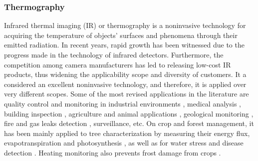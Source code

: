 \subsubsection{Thermography}
\label{sec:thermography_imaging}

Infrared thermal imaging (IR) or thermography is a noninvasive technology for acquiring the temperature of objects' surfaces and phenomena through their emitted radiation. In recent years, rapid growth has been witnessed due to the progress made in the technology of infrared detectors. Furthermore, the competition among camera manufacturers has led to releasing low-cost IR products, thus widening the applicability scope and diversity of customers. It a considered an excellent noninvasive technology, and therefore, it is applied over very different scopes. Some of the most revised applications in the literature are quality control and monitoring in industrial environments \cite{alfredo_osornio-rios_recent_2019, vollmer_infrared_2017}, medical analysis \cite{lorinczy_thermal_2017}, building inspection \cite{jarzabek-rychard_supervised_2020, kylili_infrared_2014}, agriculture and animal applications \cite{mcmanus_infrared_2016, tsouros_review_2019}, geological monitoring \cite{grechi_3d_2021}, fire and gas leaks detection \cite{gade_thermal_2014}, surveillance, etc. On crop and forest management, it has been mainly applied to tree characterization by measuring their energy flux, evapotranspiration and photosynthesis \cite{webster_three-dimensional_2018}, as well as for water stress and disease detection \cite{yandun_narvaez_survey_2017, de_oca_uas_2021, zarco-tejada_previsual_2018}. Heating monitoring also prevents frost damage from crops \cite{yuan_uav-based_2021}. 

